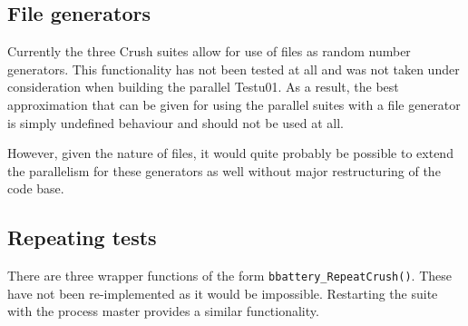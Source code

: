 \subsection{File generators}
Currently the three Crush suites allow for use of files as random number generators. This functionality has not been tested at all and was not taken under consideration when building the parallel Testu01. As a result, the best approximation that can be given for using the parallel suites with a file generator is simply undefined behaviour and should not be used at all.

However, given the nature of files, it would quite probably be possible to extend the parallelism for these generators as well without major restructuring of the code base.

\subsection{Repeating tests}
There are three wrapper functions of the form \texttt{bbattery\_RepeatCrush()}. These have not been re-implemented as it would be impossible. Restarting the suite with the process master provides a similar functionality.
